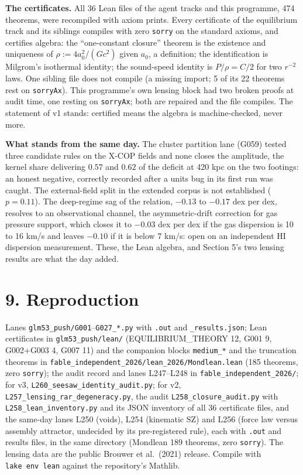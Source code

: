\documentclass[
  11pt,
]{article}
\newcounter{none} %
\begin{document}
\textbf{The certificates.} All 36 Lean files of the agent tracks and
this programme, 474 theorems, were recompiled with axiom prints. Every
certificate of the equilibrium track and its siblings compiles with zero
\texttt{sorry} on the standard axioms, and certifies algebra: the
``one-constant closure'' theorem is the existence and uniqueness of
\(\rho := 4a_0^2/(Gc^2)\) given \(a_0\), a definition; the
identification is Milgrom's isothermal identity; the sound-speed
identity is \(P/\rho = C/2\) for two \(r^{-2}\) laws. One sibling file
does not compile (a missing import; 5 of its 22 theorems rest on
\texttt{sorryAx}). This programme's own lensing block had two broken
proofs at audit time, one resting on \texttt{sorryAx}; both are repaired
and the file compiles. The statement of v1 stands: certified means the
algebra is machine-checked, never more.

\textbf{What stands from the same day.} The cluster partition lane
(G059) tested three candidate rules on the X-COP fields and none closes
the amplitude, the kernel share delivering \(0.57\) and \(0.62\) of the
deficit at 420 kpc on the two footings: an honest negative, correctly
recorded after a units bug in its first run was caught. The
external-field split in the extended corpus is not established
(\(p = 0.11\)). The deep-regime sag of the relation, \(-0.13\) to
\(-0.17\) dex per dex, resolves to an observational channel, the
asymmetric-drift correction for gas pressure support, which closes it to
\(-0.03\) dex per dex if the gas dispersion is 10 to 16 km/s and leaves
\(-0.10\) if it is below 7 km/s: open on an independent HI dispersion
measurement. These, the Lean algebra, and Section 5's two lensing
results are what the day added.

\section{9. Reproduction}\label{reproduction}

Lanes \texttt{glm53\_push/G001}--\texttt{G027\_*.py} with \texttt{.out}
and \texttt{\_results.json}; Lean certificates in
\texttt{glm53\_push/lean/} (EQUILIBRIUM\_THEORY 12, G001 9, G002+G003 4,
G007 11) and the companion blocks \texttt{medium\_*} and the truncation
theorems in \texttt{fable\_independent\_2026/lean\_2026/Mondlean.lean}
(185 theorems, zero \texttt{sorry}); the audit record and lanes
L247--L248 in \texttt{fable\_independent\_2026/}; for v3,
\texttt{L260\_seesaw\_identity\_audit.py}; for v2,
\texttt{L257\_lensing\_rar\_degeneracy.py}, the audit
\texttt{L258\_closure\_audit.py} with \texttt{L258\_lean\_inventory.py}
and its JSON inventory of all 36 certificate files, and the same-day
lanes L250 (voids), L254 (kinematic SZ) and L256 (force law versus
assembly attractor, undecided by its pre-registered rule), each with
\texttt{.out} and results files, in the same directory (Mondlean 189
theorems, zero \texttt{sorry}). The lensing data are the public Brouwer
et al.~(2021) release. Compile with \texttt{lake\ env\ lean} against the
repository's Mathlib.
\end{document}
